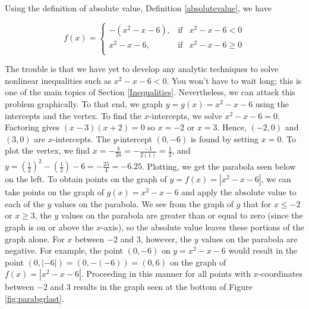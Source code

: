 {
Using the definition of absolute value, Definition \ref{absolutevalue}, we have

\setlength{\extrarowheight}{0pt}
\[ f(x) = \left\{ \begin{array}{rcl} -\left(x^2 - x - 6\right), & \mbox{if} & x^2 - x - 6 < 0  \\ x^2 - x - 6, & \mbox{if} & x^2 - x - 6 \geq 0 \\ \end{array} \right.\]
\setlength{\extrarowheight}{2pt}

The trouble is that we have yet to develop any analytic techniques to solve nonlinear inequalities such as $x^2 - x - 6 < 0$.  You won't have to wait long; this is one of the main topics of Section \ref{Inequalities}.  Nevertheless, we can attack this problem graphically.  To that end, we graph $y = g(x) = x^2 - x-6$ using the intercepts and the vertex.  To find the $x$-intercepts, we solve $x^2 - x - 6 = 0$.  Factoring gives $(x-3)(x+2)=0$ so $x=-2$ or $x=3$.  Hence, $(-2,0)$ and $(3,0)$ are $x$-intercepts. The $y$-intercept $(0,-6)$ is found by setting $x=0$.  To plot the vertex, we find $x = -\frac{b}{2a} = -\frac{-1}{2(1)} = \frac{1}{2}$, and $y =  \left(\frac{1}{2}\right)^2 - \left(\frac{1}{2}\right)-6 = -\frac{25}{4} = -6.25$.  Plotting, we get the parabola seen below on the left.  To obtain points on the graph of $y = f(x) = |x^2-x-6|$, we can take points on the graph of $g(x) =  x^2-x-6$ and apply the absolute value to each of the $y$ values on the parabola.  We see from the graph of $g$ that for $x \leq -2$ or $x \geq 3$, the $y$ values on the parabola are greater than or equal to zero (since the graph is on or above the $x$-axis), so the absolute value leaves these portions of the graph alone.  For $x$ between $-2$ and $3$, however, the $y$ values on the parabola are negative.  For example, the point $(0,-6)$ on $y = x^2-x-6$ would result in the point $(0,|-6|) = (0,-(-6))= (0,6)$ on the graph of $f(x) = |x^2-x-6|$.  Proceeding in this manner for all points with $x$-coordinates between $-2$ and $3$ results in the graph seen at the bottom of Figure \ref{fig:parabgrlast}.

}


